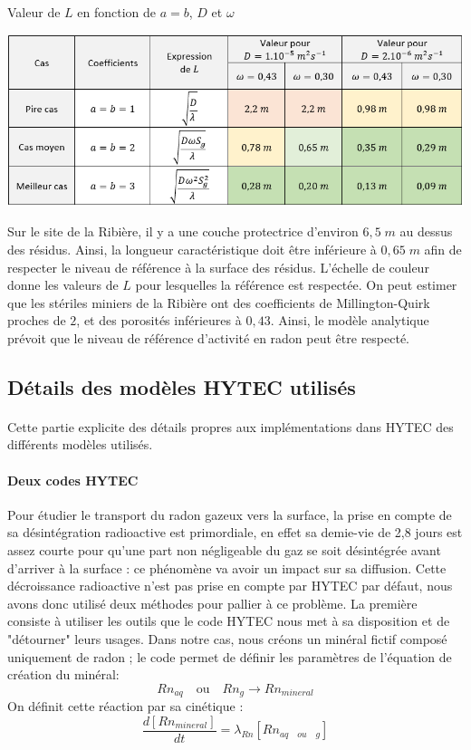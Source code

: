 \documentclass{article}
\begin{document}
\begin{table}[H]
    \centering
    \caption{Valeur de $L$ en fonction de $a=b$, $D$ et $\omega$}
    \includegraphics[width = \linewidth]{III_C_9.png}

    \label{tab:sens_mq_poro}
\end{table}

Sur le site de la Ribière, il y a une couche protectrice d'environ $6,5\;m$ au dessus des résidus. Ainsi, la longueur caractéristique doit être inférieure à $0,65\;m$ afin de respecter le niveau de référence à la surface des résidus. L'échelle de couleur donne les valeurs de $L$ pour lesquelles la référence est respectée. On peut estimer que les stériles miniers de la Ribière ont des coefficients de Millington-Quirk proches de $2$, et des porosités inférieures à $0,43$. Ainsi, le modèle analytique prévoit que le niveau de référence d'activité en radon peut être respecté.

\subsection{Détails des modèles HYTEC utilisés}
\label{annexe:detail_modele_radon_sub_sec}
\paragraph{}Cette partie explicite des détails propres aux implémentations dans HYTEC des différents modèles utilisés.

\paragraph{Deux codes HYTEC}
Pour étudier le transport du radon gazeux vers la surface, la prise en compte de sa désintégration radioactive est primordiale, en effet sa demie-vie de 2,8 jours est assez courte pour qu'une part non négligeable du gaz se soit désintégrée  avant d'arriver à la surface : ce phénomène va avoir un impact sur sa diffusion. Cette décroissance radioactive n'est pas prise en compte par HYTEC par défaut, nous avons donc utilisé deux méthodes pour pallier à ce problème.
La première consiste à utiliser les outils que le code HYTEC nous met à sa disposition et de "détourner" leurs usages. Dans notre cas, nous créons un minéral fictif composé uniquement de radon ; le code permet de définir les paramètres de l'équation de création du minéral: 
$$Rn_{aq} \quad \text{ou} \quad Rn_{g} \rightarrow Rn_{mineral}$$
On définit cette réaction par sa cinétique : 
$$ \frac{d\left[ Rn_{mineral} \right]}{dt}=\lambda_{Rn} \left[ Rn_{aq \quad ou \quad g} \right] $$
\end{document}
